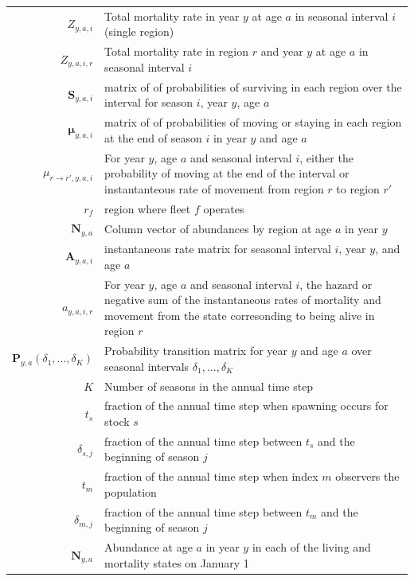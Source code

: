 \documentclass[
]{article}
\makeatletter
\providecommand{\DIFaddtex}[1]{{\protect\color{blue}\uwave{#1}}} %
\providecommand{\DIFdeltex}[1]{{\protect\color{red}\sout{#1}}} %
\providecommand{\DIFaddbegin}{} %
\providecommand{\DIFaddend}{} %
\providecommand{\DIFdelbegin}{} %
\providecommand{\DIFdelend}{} %
\providecommand{\DIFadd}[1]{\texorpdfstring{\DIFaddtex{#1}}{#1}} %
\providecommand{\DIFdel}[1]{\texorpdfstring{\DIFdeltex{#1}}{}} %
\newcommand{\DIFscaledelfig}{0.5}
\newlength{\DIFdelgraphicswidth} %
\newlength{\DIFdelgraphicsheight} %
\newcommand{\DIFaddincludegraphics}[2][]{{\color{blue}\fbox{\DIFOincludegraphics[#1]{#2}}}} %
\newcommand{\DIFdelincludegraphics}[2][]{%
\sbox{\DIFdelgraphicsbox}{\DIFOincludegraphics[#1]{#2}}%
\settoboxwidth{\DIFdelgraphicswidth}{\DIFdelgraphicsbox} %
\settoboxtotalheight{\DIFdelgraphicsheight}{\DIFdelgraphicsbox} %
\scalebox{\DIFscaledelfig}{%
\parbox[b]{\DIFdelgraphicswidth}{\usebox{\DIFdelgraphicsbox}\\[-\baselineskip] \rule{\DIFdelgraphicswidth}{0em}}\llap{\resizebox{\DIFdelgraphicswidth}{\DIFdelgraphicsheight}{%
\setlength{\unitlength}{\DIFdelgraphicswidth}%
\begin{picture}(1,1)%
\thicklines\linethickness{2pt} %
{\color[rgb]{1,0,0}\put(0,0){\framebox(1,1){}}}%
{\color[rgb]{1,0,0}\put(0,0){\line( 1,1){1}}}%
{\color[rgb]{1,0,0}\put(0,1){\line(1,-1){1}}}%
\end{picture}%
}\hspace*{3pt}}} %
} %
\DeclareRobustCommand{\DIFaddbegin}{\DIFOaddbegin \let\includegraphics\DIFaddincludegraphics} %
\DeclareRobustCommand{\DIFaddend}{\DIFOaddend \let\includegraphics\DIFOincludegraphics} %
\DeclareRobustCommand{\DIFdelbegin}{\DIFOdelbegin \let\includegraphics\DIFdelincludegraphics} %
\DeclareRobustCommand{\DIFdelend}{\DIFOaddend \let\includegraphics\DIFOincludegraphics} %
\let\sout@orig\sout %
\renewcommand{\sout}[1]{\ifmmode\text{\sout@orig{\ensuremath{#1}}}\else\sout@orig{#1}\fi} %
\makeatother
\begin{document}
\begin{longtable}[c]{r p{}}
$Z_{y,a,i}$ & Total mortality rate in year $y$ at age $a$ in seasonal interval $i$ (single region)\\
$Z_{y,a,i,r}$ & Total mortality rate in region $r$ and year $y$ at age $a$ in seasonal interval $i$\\
$\mathbf{S}_{y,a,i}$ & matrix of of probabilities of surviving in each region over the interval for season $i$, year $y$, age $a$ \\
$\boldsymbol{\mu}_{y,a,i}$ & matrix of of probabilities of moving or staying in each region at the end of season $i$ in year $y$ and age $a$ \\
$\mu_{r\rightarrow r',y,a,i}$ & For year $y$, age $a$ and seasonal interval $i$, either the probability of moving at the end of the interval or instantanteous rate of movement from region $r$ to region $r'$\\
$r_f$ & region where fleet $f$ operates\\
$\mathbf{N}_{y,a}$ & Column vector of abundances by region at age $a$ in year $y$\\
$\mathbf{A}_{y,a,i}$ & instantaneous rate matrix for seasonal interval $i$, year $y$, and age $a$\\
$a_{y,a,i,r}$ & For year $y$, age $a$ and seasonal interval $i$, the hazard or negative sum of the instantaneous rates of mortality and movement from the state corresonding to being alive in region $r$ \\
$\mathbf{P}_{y,a}(\delta_1,\ldots,\delta_K)$ & Probability transition matrix for year $y$ and age $a$ over seasonal intervals $\delta_1,\ldots, \delta_K$\\
$K$ & Number of seasons in the annual time step\\
$t_s$ & fraction of the annual time step when spawning occurs for stock $s$\\
\DIFdelbegin \DIFdel{$\delta_{s,j}$ }\DIFdelend \DIFaddbegin \DIFadd{$\delta_{s,i}$ }\DIFaddend & fraction of the annual time step between $t_s$ and the beginning of season \DIFdelbegin \DIFdel{$j$}\DIFdelend \DIFaddbegin \DIFadd{$i$}\DIFaddend \\
$t_m$ & fraction of the annual time step when index $m$ observers the population\\
\DIFdelbegin \DIFdel{$\delta_{m,j}$ }\DIFdelend \DIFaddbegin \DIFadd{$\delta_{m,i}$ }\DIFaddend & fraction of the annual time step between $t_m$ and the beginning of season \DIFdelbegin \DIFdel{$j$}\DIFdelend \DIFaddbegin \DIFadd{$i$}\DIFaddend \\
$\mathbf{N}_{y,a}$ & Abundance at age $a$ in year $y$ in each of the living and mortality states on January 1\\

\end{longtable}
\end{document}
